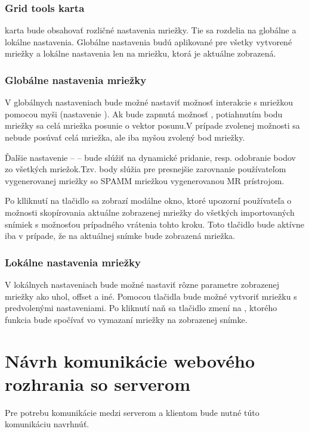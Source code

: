\subsubsection {Grid tools karta}
 karta bude obsahovať rozličné nastavenia mriežky. Tie sa rozdelia na globálne a lokálne nastavenia. Globálne nastavenia budú aplikované pre všetky vytvorené mriežky a lokálne nastavenia len na mriežku, ktorá je aktuálne zobrazená.

\subsubsection*{Globálne nastavenia mriežky}
V globálnych nastaveniach bude možné nastaviť možnosť interakcie s mriežkou pomocou myši (nastavenie ). Ak bude zapnutá možnosť , potiahnutím bodu mriežky sa celá mriežka posunie o vektor posunu.\newline V prípade zvolenej možnosti  sa nebude posúvať celá mriežka, ale iba myšou zvolený bod mriežky.

Ďalšie nastavenie --  -- bude slúžiť na dynamické pridanie, resp. odobranie  bodov zo všetkých mriežok.\newline Tzv.  body slúžia pre presnejšie zarovnanie používateľom vygenerovanej mriežky so SPAMM mriežkou vygenerovanou MR prístrojom.

Po klliknutí na tlačidlo  sa zobrazí modálne okno, ktoré upozorní používateľa o možnosti skopírovania aktuálne zobrazenej mriežky do všetkých importovaných snímiek s možnosťou prípadného vrátenia tohto kroku. Toto tlačidlo bude aktívne iba v prípade, že na aktuálnej snímke bude zobrazená mriežka.

\subsubsection* {Lokálne nastavenia mriežky}
V lokálnych nastaveniach bude možné nastaviť rôzne parametre zobrazenej mriežky ako uhol, offset a iné. Pomocou tlačidla  bude možné vytvoriť mriežku s predvolenými nastaveniami. Po kliknutí naň sa tlačidlo zmení na , ktorého funkcia bude spočívať vo vymazaní mriežky na zobrazenej snímke.

\section {Návrh komunikácie webového rozhrania so serverom}\label{api_endpoint}
Pre potrebu komunikácie medzi serverom a klientom bude nutné túto komunikáciu navrhnúť. 

